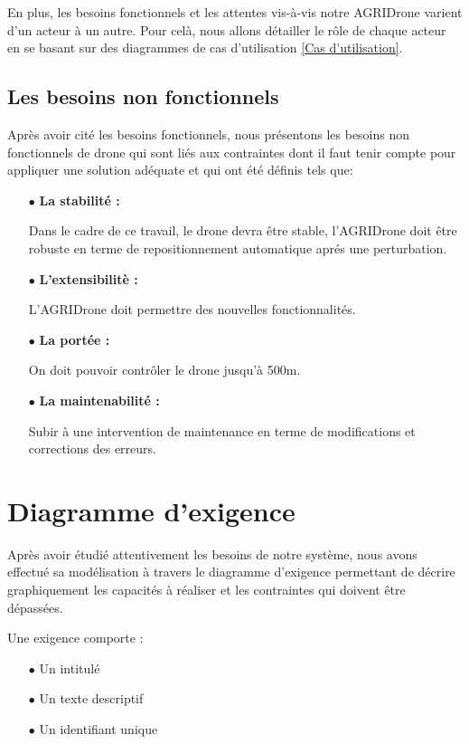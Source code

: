 En plus, les besoins fonctionnels et les attentes vis-à-vis notre AGRIDrone varient d'un acteur à un autre. Pour celà, nous allons détailler le rôle de chaque acteur en se basant sur des diagrammes de cas d'utilisation \ref{Cas d'utilisation}.

\subsection{Les besoins non fonctionnels}
Après avoir cité les besoins fonctionnels, nous présentons
les besoins non fonctionnels de drone qui sont liés aux contraintes dont il faut tenir compte pour appliquer une solution adéquate et qui ont été définis tels que:
\begin{itemize}
	\item [$\bullet$] \textbf{La stabilité :}
	
	
	Dans le cadre de ce travail, le drone devra être stable, l'AGRIDrone doit être robuste en terme de repositionnement automatique aprés une perturbation.	
	\item [$\bullet$] \textbf{L'extensibilitè : }
	
	
	L'AGRIDrone doit permettre des nouvelles fonctionnalités.
	
	\item [$\bullet$] \textbf{La portée : } 
	
	
	On doit pouvoir contrôler le drone jusqu'à 500m.
	
	
	\item [$\bullet$] \textbf{La maintenabilité : }  
	
	Subir à une intervention de maintenance en terme de modifications et corrections des erreurs.
	\end {itemize}
	\section{Diagramme d'exigence }
	Après avoir étudié attentivement les besoins de  notre système, nous avons effectué sa modélisation à travers le diagramme d'exigence permettant de décrire graphiquement les capacités à réaliser et les contraintes qui doivent être dépassées.
	
	Une exigence comporte : 
	\begin{itemize}
		\item [$\bullet$] Un intitulé 
		
		\item [$\bullet$]Un texte descriptif 
		
		\item [$\bullet$]Un identifiant unique
	\end{itemize}
	

